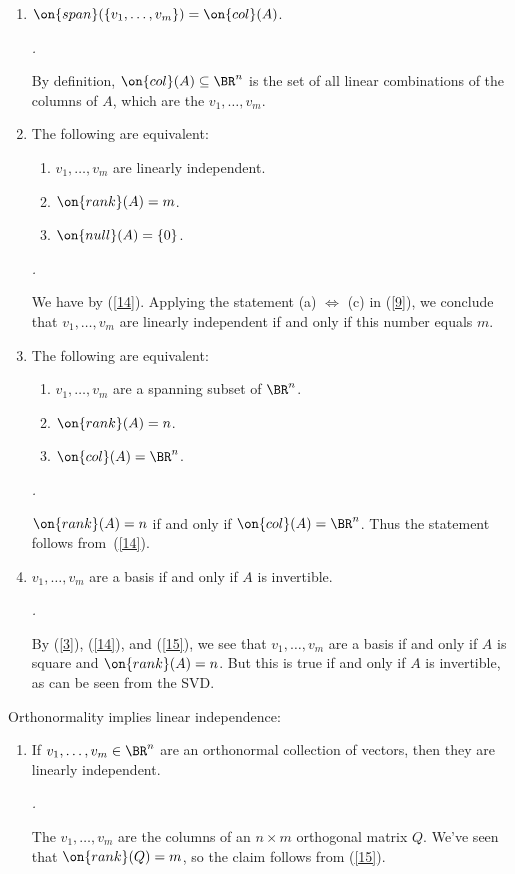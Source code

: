 \documentclass[10pt]{amsart}
\makeatletter
\renewenvironment{proof}[1][\proofname]{\par
	\pushQED{\qed}%
	\normalfont \topsep6\p@\@plus6\p@\relax
	\noindent\emph{#1.} 
	\ignorespaces
}{%
\popQED\endtrivlist\@endpefalse
}
\theoremstyle{mythm}
\theoremstyle{definition}
\theoremstyle{myrmk}
\newenvironment{myproof}{\color{blue}\begin{proof}}{\end{proof}}
\newcounter{part-count}
\newenvironment{me}{\begin{enumerate}\setcounter{enumi}{\value{part-count}}}{\setcounter{part-count}{\value{enumi}}\end{enumerate}}
\makeatother
\begin{document}
	\begin{me}
		\item \label{14} $\on{span}(\{v_1, \ldots, v_m\}) = \on{col}(A)$. 
		\begin{myproof}
			By definition, $\on{col}(A) \subseteq \BR^n$ is the set of all linear combinations of the columns of $A$, which are the $v_1, \ldots, v_m$. 
		\end{myproof}
		\item \label{15} 
		The following are equivalent: 
		\begin{enumerate}[label=(\alph*)]
			\item $v_1, \ldots, v_m$ are linearly independent. 
			\item $\on{rank}(A) = m$. 
			\item $\on{null}(A) = \{0\}$. 
		\end{enumerate} 
		\begin{myproof}
			We have 
			by (\ref{14}). Applying the statement (a) $\Leftrightarrow$ (c) in (\ref{9}), we conclude that $v_1, \ldots, v_m$ are linearly independent if and only if this number equals $m$. 
		\end{myproof} 
		\item \label{16} The following are equivalent: 
		\begin{enumerate}[label=(\alph*)]
			\item $v_1, \ldots, v_m$ are a spanning subset of $\BR^n$.  
			\item $\on{rank}(A) = n$. 
			\item $\on{col}(A) = \BR^n$. 
		\end{enumerate}
		\begin{myproof}
			$\on{rank}(A) = n$ if and only if $\on{col}(A) = \BR^n$. Thus the statement follows from~(\ref{14}). 
		\end{myproof}
		\item $v_1, \ldots, v_m$ are a basis if and only if $A$ is invertible. 
		\begin{myproof}
			By (\ref{3}), (\ref{14}), and (\ref{15}), we see that $v_1, \ldots, v_m$ are a basis if and only if $A$ is square and $\on{rank}(A) = n$. But this is true if and only if $A$ is invertible, as can be seen from the SVD. 
		\end{myproof}
	\end{me}
	\noindent Orthonormality implies linear independence: 
	\begin{me}
		\item If $v_1, \ldots, v_m \in \BR^n$ are an orthonormal collection of vectors, then they are linearly independent. 
		\begin{myproof}
			The $v_1, \ldots, v_m$ are the columns of an $n \times m$ orthogonal matrix $Q$. We've seen that $\on{rank}(Q) = m$, so the claim follows from (\ref{15}).  
		\end{myproof}
	\end{me}
	
	
\end{document}
